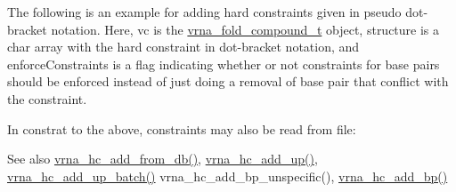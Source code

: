 The following is an example for adding hard constraints given in pseudo dot-\/bracket notation. Here, {\ttfamily vc} is the \mbox{\hyperlink{group__fold__compound_ga1b0cef17fd40466cef5968eaeeff6166}{vrna\+\_\+fold\+\_\+compound\+\_\+t}} object, {\ttfamily structure} is a char array with the hard constraint in dot-\/bracket notation, and {\ttfamily enforce\+Constraints} is a flag indicating whether or not constraints for base pairs should be enforced instead of just doing a removal of base pair that conflict with the constraint.


\begin{DoxyCodeInclude}{0}
\DoxyCodeLine{}
\DoxyCodeLine{}
\DoxyCodeLine{}
\end{DoxyCodeInclude}
 In constrat to the above, constraints may also be read from file\+:


\begin{DoxyCodeInclude}{0}
\end{DoxyCodeInclude}
 \begin{DoxySeeAlso}{See also}
\mbox{\hyperlink{group__hard__constraints_ga5b4de3247b67358080c176b94591a8e6}{vrna\+\_\+hc\+\_\+add\+\_\+from\+\_\+db()}}, \mbox{\hyperlink{group__hard__constraints_ga447d88e06ad97bb225cd83310ace8345}{vrna\+\_\+hc\+\_\+add\+\_\+up()}}, \mbox{\hyperlink{group__hard__constraints_ga5070f296c8af2baea10951525519464f}{vrna\+\_\+hc\+\_\+add\+\_\+up\+\_\+batch()}} vrna\+\_\+hc\+\_\+add\+\_\+bp\+\_\+unspecific(), \mbox{\hyperlink{group__hard__constraints_ga7cba95ebe2ceb5ec9a5768f2232854fd}{vrna\+\_\+hc\+\_\+add\+\_\+bp()}}
\end{DoxySeeAlso}

